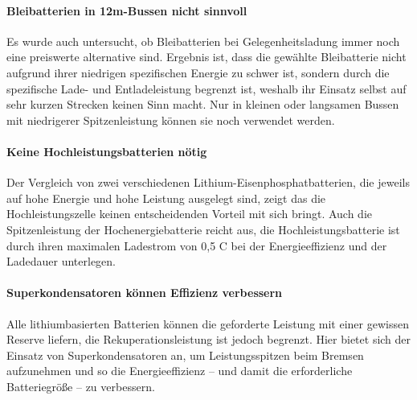 \paragraph{Bleibatterien in 12m-Bussen nicht sinnvoll} Es wurde auch untersucht, ob Bleibatterien bei Gelegenheitsladung immer noch eine preiswerte alternative sind. Ergebnis ist, dass die gewählte Bleibatterie nicht aufgrund ihrer niedrigen spezifischen Energie zu schwer ist, sondern durch die spezifische Lade- und Entladeleistung begrenzt ist, weshalb ihr Einsatz selbst auf sehr kurzen Strecken keinen Sinn macht. Nur in kleinen oder langsamen Bussen mit niedrigerer Spitzenleistung können sie noch verwendet werden.

\paragraph{Keine Hochleistungsbatterien nötig} Der Vergleich von zwei verschiedenen Lithium-Eisenphosphatbatterien, die jeweils auf hohe Energie und hohe Leistung ausgelegt sind, zeigt das die Hochleistungszelle keinen entscheidenden Vorteil mit sich bringt. Auch die Spitzenleistung der Hochenergiebatterie reicht aus, die Hochleistungsbatterie ist durch ihren maximalen Ladestrom von 0,5 C bei  der Energieeffizienz und der Ladedauer unterlegen.

\paragraph{Superkondensatoren können Effizienz verbessern} Alle lithiumbasierten Batterien können die geforderte Leistung mit einer gewissen Reserve liefern, die Rekuperationsleistung ist jedoch begrenzt. Hier bietet sich der Einsatz von Superkondensatoren an, um Leistungsspitzen beim Bremsen aufzunehmen und so die Energieeffizienz – und damit die erforderliche Batteriegröße – zu verbessern.

